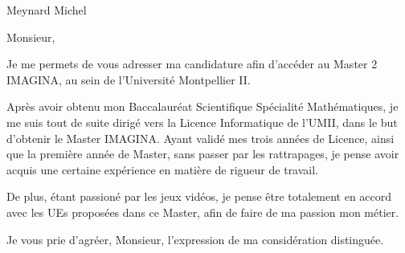 \documentclass[a4paper]{letter}
\date{\today}
\begin{document}
\begin{letter}{Meynard Michel}
\opening{Monsieur,}

Je me permets de vous adresser ma candidature afin d'accéder au Master 2 IMAGINA, au sein de l'Université Montpellier II.

Après avoir obtenu mon Baccalauréat Scientifique Spécialité Mathématiques, je me suis tout de suite dirigé vers la Licence Informatique de l'UMII, dans le but d'obtenir le Master IMAGINA. Ayant validé mes trois années de Licence, ainsi que la première année de Master, sans passer par les rattrapages, je pense avoir acquis une certaine expérience en matière de rigueur de travail.

De plus, étant passioné par les jeux vidéos, je pense être totalement en accord avec les UEs proposées dans ce Master, afin de faire de ma passion mon métier.

\closing{Je vous prie d'agréer, Monsieur, l'expression de ma considération distinguée.}

\end{letter}
\end{document}
